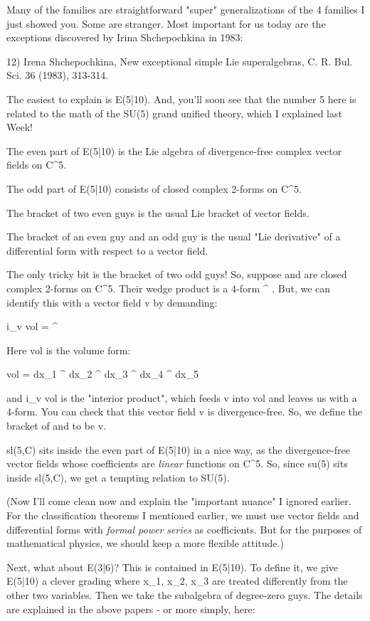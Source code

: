 Many of the families are straightforward "super" generalizations 
of the 4 families I just showed you.  Some are stranger.  Most 
important for us today are the exceptions discovered by Irina 
Shchepochkina in 1983:

12) Irena Shchepochkina, New exceptional simple Lie superalgebras, 
C. R. Bul. Sci. 36 (1983), 313-314.

The easiest to explain is E(5|10).  And, you'll soon see that the 
number 5 here is related to the math of the SU(5) grand unified 
theory, which I explained last Week!

The even part of E(5|10) is the Lie algebra of divergence-free complex 
vector fields on C^{5}.  

The odd part of E(5|10) consists of closed complex 2-forms on C^{5}.

The bracket of two even guys is the usual Lie bracket of vector 
fields. 

The bracket of an even guy and an odd guy is the usual "Lie 
derivative" of a differential form with respect to a vector field.   

The only tricky bit is the bracket of two odd guys!  So, suppose \mu 
and \nu  are closed complex 2-forms on C^{5}.  Their wedge
product is a 4-form \mu  ^ \nu .  But, we can identify this with a vector
field v by demanding:

i_{v} vol = \mu  ^ \nu 

Here vol is the volume form:

vol = dx_{1} ^ dx_{2} ^ dx_{3} ^ dx_{4} ^ dx_{5}

and i_{v} vol is the "interior product", which feeds
v into vol and leaves us with a 4-form.  You can check that this
vector field v is divergence-free.  So, we define the bracket of \mu 
and \nu  to be v.

sl(5,C) sits inside the even part of E(5|10) in a nice way, as 
the divergence-free vector fields whose coefficients are \emph{linear} 
functions on C^{5}.   So, since su(5) sits inside sl(5,C), we get a 
tempting relation to SU(5).

(Now I'll come clean now and explain the "important nuance" I 
ignored earlier.  For the classification theorems I mentioned
earlier, we must use vector fields and differential forms with 
\emph{formal power series} as coefficients.    But for the purposes
of mathematical physics, we should keep a more flexible attitude.)

Next, what about E(3|6)?  This is contained in E(5|10).  To define 
it, we give E(5|10) a clever grading where x_{1}, x_{2}, 
x_{3} are 
treated differently from the other two variables.  Then we take 
the subalgebra of degree-zero guys.  The details are explained in 
the above papers - or more simply, here:

